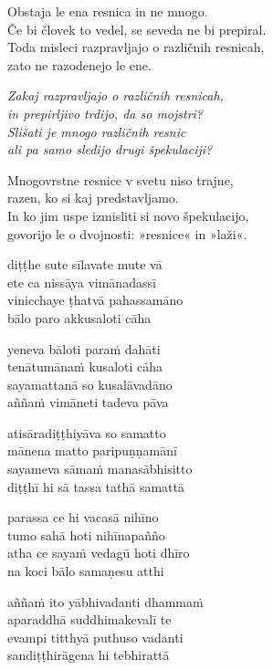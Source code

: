 Obstaja le ena resnica in ne mnogo.\\
Če bi človek to vedel, se seveda ne bi prepiral.\\
Toda misleci razpravljajo o različnih resnicah,\\
zato ne razodenejo le ene.

\emph{Zakaj razpravljajo o različnih resnicah,\\
in prepirljivo trdijo, da so mojstri?\\
Slišati je mnogo različnih resnic\\
ali pa samo sledijo drugi špekulaciji?}

Mnogovrstne resnice v svetu niso trajne,\\
razen, ko si kaj predstavljamo.\\
In ko jim uspe izmisliti si novo špekulacijo,\\
govorijo le o dvojnosti: »resnice« in »laži«.


\clearpage

diṭṭhe sute sīlavate mute vā\\
ete ca nissāya vimānadassī\\
vinicchaye ṭhatvā pahassamāno\\
bālo paro akkusaloti cāha

yeneva bāloti paraṁ dahāti\\
tenātumānaṁ kusaloti cāha\\
sayamattanā so kusalāvadāno\\
aññaṁ vimāneti tadeva pāva

atisāradiṭṭhiyāva so samatto\\
mānena matto paripuṇṇamānī\\
sayameva sāmaṁ manasābhisitto\\
diṭṭhī hi sā tassa tathā samattā

parassa ce hi vacasā nihīno\\
tumo sahā hoti nihīnapañño\\
atha ce sayaṁ vedagū hoti dhīro\\
na koci bālo samaṇesu atthi

aññaṁ ito yābhivadanti dhammaṁ\\
aparaddhā suddhimakevalī te\\
evampi titthyā puthuso vadanti\\
sandiṭṭhirāgena hi tebhirattā

